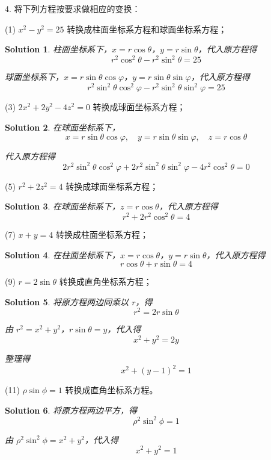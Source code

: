 \documentclass[a4paper,12pt]{article}
\newtheorem*{sol}{Solution}
\begin{document}
4. 将下列方程按要求做相应的变换：

(1) $x^2 - y^2 = 25$ 转换成柱面坐标系方程和球面坐标系方程；

\begin{sol}
    柱面坐标系下，$x = r\cos\theta$，$y = r\sin\theta$，代入原方程得
    $$r^2\cos^2\theta - r^2\sin^2\theta = 25$$

    球面坐标系下，$x = r\sin\theta\cos\varphi$，$y = r\sin\theta\sin\varphi$，代入原方程得
    $$r^2\sin^2\theta\cos^2\varphi - r^2\sin^2\theta\sin^2\varphi = 25$$
\end{sol}

(3) $2x^2 + 2y^2 - 4z^2 = 0$ 转换成球面坐标系方程；

\begin{sol}
    在球面坐标系下，
    $$x = r\sin\theta\cos\varphi, \quad y = r\sin\theta\sin\varphi, \quad z = r\cos\theta$$

    代入原方程得
    $$2r^2\sin^2\theta\cos^2\varphi + 2r^2\sin^2\theta\sin^2\varphi - 4r^2\cos^2\theta = 0$$
\end{sol}

(5) $r^2 + 2z^2 = 4$ 转换成球面坐标系方程；

\begin{sol}
    在球面坐标系下，$z = r\cos\theta$，代入原方程得
    $$r^2 + 2r^2\cos^2\theta = 4$$
\end{sol}

(7) $x + y = 4$ 转换成柱面坐标系方程；

\begin{sol}
    在柱面坐标系下，$x = r\cos\theta$，$y = r\sin\theta$，代入原方程得
    $$r\cos\theta + r\sin\theta = 4$$
\end{sol}

(9) $r = 2\sin\theta$ 转换成直角坐标系方程；

\begin{sol}
    将原方程两边同乘以 $r$，得
    $$r^2 = 2r\sin\theta$$

    由 $r^2 = x^2 + y^2$，$r\sin\theta = y$，代入得
    $$x^2 + y^2 = 2y$$

    整理得
    $$x^2 + (y - 1)^2 = 1$$
\end{sol}

(11) $\rho\sin\phi = 1$ 转换成直角坐标系方程。

\begin{sol}
    将原方程两边平方，得
    $$\rho^2\sin^2\phi = 1$$

    由 $\rho^2\sin^2\phi = x^2 + y^2$，代入得
    $$x^2 + y^2 = 1$$
\end{sol}
\end{document}
